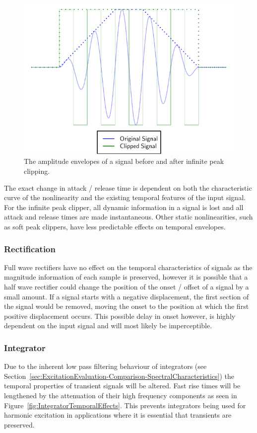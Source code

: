 			\begin{figure}[h!]
				\centering
				\includegraphics{chapter5/Images/InfinitePeakClipping.pdf}
				\caption{The amplitude envelopes of a signal before and after infinite peak clipping.}
				\label{fig:InfinitePeakClipping}
			\end{figure}

			The exact change in attack / release time is dependent on both the characteristic curve of the
			nonlinearity and the existing temporal features of the input signal. For the infinite peak clipper,
			all dynamic information in a signal is lost and all attack and release times are made
			instantaneous. Other static nonlinearities, such as soft peak clippers, have less predictable
			effects on temporal envelopes. 

		\subsubsection*{Rectification}
			Full wave rectifiers have no effect on the temporal characteristics of signals as the magnitude
			information of each sample is preserved, however it is possible that a half wave rectifier could
			change the position of the onset / offset of a signal by a small amount. If a signal starts with a
			negative displacement, the first section of the signal would be removed, moving the onset to the
			position at which the first positive displacement occurs. This possible delay in onset however, is
			highly dependent on the input signal and will most likely be imperceptible.
			
		\subsubsection*{Integrator}
			Due to the inherent low pass filtering behaviour of integrators (see
			Section~\ref{sec:ExcitationEvaluation-Comparison-SpectralCharacteristics}) the temporal properties
			of transient signals will be altered. Fast rise times will be lengthened by the attenuation of
			their high frequency components as seen in Figure~\ref{fig:IntegratorTemporalEffects}. This
			prevents integrators being used for harmonic excitation in applications where it is essential that
			transients are preserved. 

